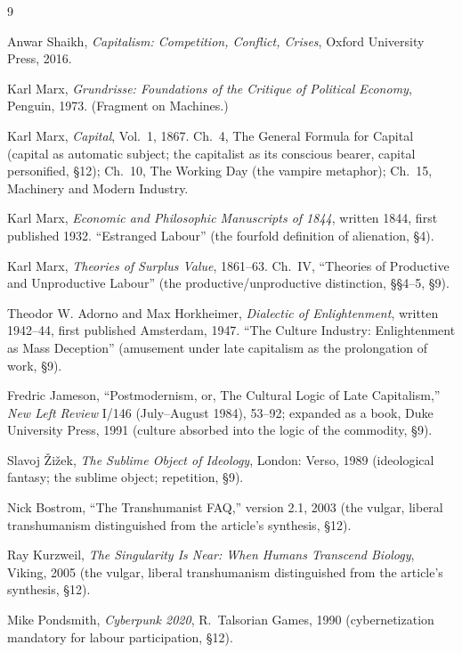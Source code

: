 \documentclass[11pt]{article}
\begin{document}
\begin{thebibliography}{9}

 Anwar Shaikh, \textit{Capitalism: Competition,
Conflict, Crises}, Oxford University Press, 2016.

 Karl Marx, \textit{Grundrisse: Foundations of the
Critique of Political Economy}, Penguin, 1973. (Fragment on Machines.)

 Karl Marx, \textit{Capital}, Vol.~1, 1867. Ch.~4,
The General Formula for Capital (capital as automatic subject; the
capitalist as its conscious bearer, capital personified, §12); Ch.~10,
The Working Day (the vampire metaphor); Ch.~15, Machinery and Modern
Industry.

 Karl Marx, \textit{Economic and Philosophic
Manuscripts of 1844}, written 1844, first published 1932. ``Estranged
Labour'' (the fourfold definition of alienation, §4).

 Karl Marx, \textit{Theories of Surplus Value},
1861--63. Ch.~IV, ``Theories of Productive and Unproductive Labour''
(the productive/unproductive distinction, §§4--5, §9).

 Theodor W. Adorno and Max Horkheimer,
\textit{Dialectic of Enlightenment}, written 1942--44, first published
Amsterdam, 1947. ``The Culture Industry: Enlightenment as Mass
Deception'' (amusement under late capitalism as the prolongation of
work, §9).

 Fredric Jameson, ``Postmodernism, or, The Cultural
Logic of Late Capitalism,'' \textit{New Left Review} I/146 (July--August
1984), 53--92; expanded as a book, Duke University Press, 1991 (culture
absorbed into the logic of the commodity, §9).

 Slavoj \v{Z}i\v{z}ek, \textit{The Sublime Object of
Ideology}, London: Verso, 1989 (ideological fantasy; the sublime object;
repetition, §9).

 Nick Bostrom, ``The Transhumanist FAQ,'' version
2.1, 2003 (the vulgar, liberal transhumanism distinguished from the
article's synthesis, §12).

 Ray Kurzweil, \textit{The Singularity Is Near:
When Humans Transcend Biology}, Viking, 2005 (the vulgar, liberal
transhumanism distinguished from the article's synthesis, §12).

 Mike Pondsmith, \textit{Cyberpunk 2020},
R.~Talsorian Games, 1990 (cybernetization mandatory for labour
participation, §12).


\end{thebibliography}
\end{document}
